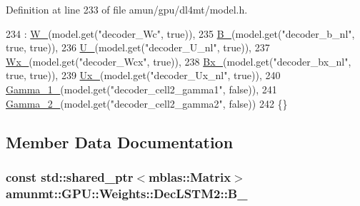 Definition at line 233 of file amun/gpu/dl4mt/model.\+h.


\begin{DoxyCode}
234     : \hyperlink{structamunmt_1_1GPU_1_1Weights_1_1DecLSTM2_a6d1d64dcc62bfaaa0ee85a5c723a32ce}{W\_}(model.get(\textcolor{stringliteral}{"decoder\_Wc"}, \textcolor{keyword}{true})),
235       \hyperlink{structamunmt_1_1GPU_1_1Weights_1_1DecLSTM2_a0be2ed160a6730591ebaacbb8e1d65b1}{B\_}(model.get(\textcolor{stringliteral}{"decoder\_b\_nl"}, \textcolor{keyword}{true}, \textcolor{keyword}{true})),
236       \hyperlink{structamunmt_1_1GPU_1_1Weights_1_1DecLSTM2_a8f38b72c8a7fc53154042bf7a9715da5}{U\_}(model.get(\textcolor{stringliteral}{"decoder\_U\_nl"}, \textcolor{keyword}{true})),
237       \hyperlink{structamunmt_1_1GPU_1_1Weights_1_1DecLSTM2_ab0f487eb7f751eee86cd47bca625bd26}{Wx\_}(model.get(\textcolor{stringliteral}{"decoder\_Wcx"}, \textcolor{keyword}{true})),
238       \hyperlink{structamunmt_1_1GPU_1_1Weights_1_1DecLSTM2_a7a70cd1fe9bdce85fbbeee1d88b9abe7}{Bx\_}(model.get(\textcolor{stringliteral}{"decoder\_bx\_nl"}, \textcolor{keyword}{true}, \textcolor{keyword}{true})),
239       \hyperlink{structamunmt_1_1GPU_1_1Weights_1_1DecLSTM2_a1adb7f081ddd863e8e65c491ddb8d484}{Ux\_}(model.get(\textcolor{stringliteral}{"decoder\_Ux\_nl"}, \textcolor{keyword}{true})),
240       \hyperlink{structamunmt_1_1GPU_1_1Weights_1_1DecLSTM2_aae5a30acdf8ac081e637d8f619eff095}{Gamma\_1\_}(model.get(\textcolor{stringliteral}{"decoder\_cell2\_gamma1"}, \textcolor{keyword}{false})),
241       \hyperlink{structamunmt_1_1GPU_1_1Weights_1_1DecLSTM2_a3f15c6e48f5c63685d3645bba5b755cb}{Gamma\_2\_}(model.get(\textcolor{stringliteral}{"decoder\_cell2\_gamma2"}, \textcolor{keyword}{false}))
242     \{\}
\end{DoxyCode}


\subsection{Member Data Documentation}
\subsubsection[{\texorpdfstring{B\+\_\+}{B_}}]{\setlength{\rightskip}{0pt plus 5cm}const std\+::shared\+\_\+ptr$<${\bf mblas\+::\+Matrix}$>$ amunmt\+::\+G\+P\+U\+::\+Weights\+::\+Dec\+L\+S\+T\+M2\+::\+B\+\_\+}\hypertarget{structamunmt_1_1GPU_1_1Weights_1_1DecLSTM2_a0be2ed160a6730591ebaacbb8e1d65b1}{}\label{structamunmt_1_1GPU_1_1Weights_1_1DecLSTM2_a0be2ed160a6730591ebaacbb8e1d65b1}


